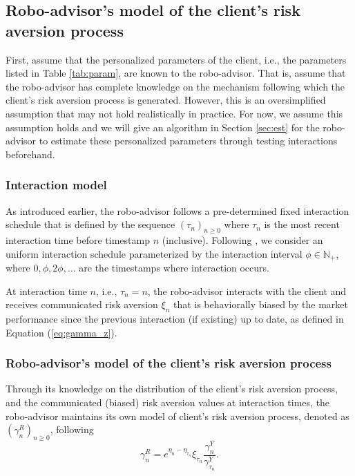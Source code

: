 \subsection{Robo-advisor's model of the client's risk aversion process}
First,  assume that the personalized parameters of the client, i.e., the parameters listed in Table \ref{tab:param}, are known to the robo-advisor. That is,  assume that the robo-advisor has complete knowledge on the mechanism following which the client's risk aversion process is generated. However, this is an oversimplified assumption that may not hold realistically in practice. For now, we assume this assumption holds and we will give an algorithm in Section \ref{sec:est} for the robo-advisor to estimate these personalized parameters through testing interactions beforehand.

\subsubsection{Interaction model} As introduced earlier, the robo-advisor follows a pre-determined fixed interaction schedule that is defined by the sequence $(\tau_n)_{n\geq0}$ where $\tau_n$ is the most recent interaction time before timestamp $n$ (inclusive). Following , we consider an uniform interaction schedule parameterized by the interaction interval $\phi\in\mathbb{N}_+$, where $0,\phi,2\phi,\ldots$ are the timestamps where interaction occurs.

At interaction time $n$, i.e., $\tau_n=n$, the robo-advisor interacts with the client and receives communicated risk aversion $\xi_n$ that is behaviorally biased by the market performance since the previous interaction (if existing) up to date, as defined in Equation (\ref{eq:gamma_z}).

\subsubsection{Robo-advisor's model of the client's risk aversion process}

Through its knowledge on the distribution of the client's risk aversion process, and the communicated (biased) risk aversion values at interaction times, the robo-advisor maintains its own model of client's risk aversion process, denoted as $(\gamma_n^R)_{n\geq0}$, following \begin{equation}
    \label{eq:gamma_r}
    \gamma_n^R=e^{\eta_n-\eta_{\tau_n}}\xi_{\tau_n}\frac{\gamma_n^Y}{\gamma^Y_{\tau_n}}.
\end{equation}

